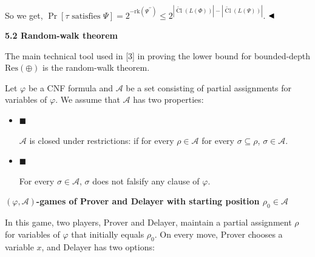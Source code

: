 \documentclass[10pt,a4paper]{article}
\begin{document}
So we get, $\Pr[\tau\mbox{ satisfies }\Psi]=2^{-\mathrm{rk}(\Psi^{\prime\prime})}\leq 2^{|\widetilde{\mathop{\mathrm{Cl}}}(L(\Phi))|-|\widetilde{\mathop{\mathrm{Cl}}}(L(\Psi))|}$.
$\hfill\blacktriangleleft$\par


\par\medskip\noindent\textbf{
5.2 Random-walk theorem}\par


The main technical tool used in [3] in proving the lower bound for bounded-depth $\mathrm{Res}(\oplus)$ is the random-walk theorem.\par



Let $\varphi$ be a CNF formula and $\mathcal{A}$ be a set consisting of partial assignments for variables of $\varphi$. We assume that $\mathcal{A}$ has two properties:\par


\begin{itemize}


\item 
$\blacksquare$ 


$\mathcal{A}$ is closed under restrictions: if for every $\rho\in\mathcal{A}$ for every $\sigma\subseteq\rho$, $\sigma\in\mathcal{A}$.\par





\item 
$\blacksquare$ 


For every $\sigma\in\mathcal{A}$, $\sigma$ does not falsify any clause of $\varphi$.\par





\end{itemize}


\par\medskip\noindent\textbf{
$(\varphi,\mathcal{A})$-games of Prover and Delayer with starting position $\rho_{0}\in\mathcal{A}$
}\par


In this game, two players, Prover and Delayer, maintain a partial assignment $\rho$ for variables of $\varphi$ that initially equals $\rho_{0}$.
On every move, Prover chooses a variable $x$, and Delayer has two options:\par
\end{document}
